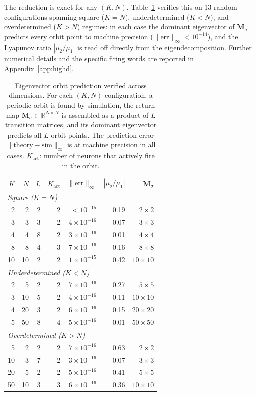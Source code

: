\documentclass[12pt]{article}
\newcommand{\vv}[1]{\mathbf{#1}}
\newcommand{\RR}{\mathbb{R}}
\begin{document}
The reduction is exact for any $(K,N)$. Table~\ref{tab:highd} verifies this on 13 random configurations spanning square ($K=N$), underdetermined ($K<N$), and overdetermined ($K>N$) regimes: in each case the dominant eigenvector of $\vv{M}_\sigma$ predicts every orbit point to machine precision ($\|\text{err}\|_\infty<10^{-14}$), and the Lyapunov ratio $|\mu_2/\mu_1|$ is read off directly from the eigendecomposition. Further numerical details and the specific firing words are reported in Appendix~\ref{app:highd}.

\begin{table}[t]
\centering
\caption{Eigenvector orbit prediction verified across dimensions.  
For each $(K,N)$ configuration, a periodic orbit is found by simulation, 
the return map $\vv{M}_\sigma\in\RR^{N\times N}$ is assembled as a 
product of $L$ transition matrices, and its dominant eigenvector predicts 
all $L$ orbit points.  The prediction error 
$\|\text{theory}-\text{sim}\|_\infty$ is at machine precision in all 
cases.  $K_{\text{act}}$: number of neurons that actively fire in the 
orbit.}\label{tab:highd}
\begin{tabular}{rr rrr rr}
\toprule
$K$ & $N$ & $L$ & $K_{\text{act}}$ & $\|\text{err}\|_\infty$ 
& $|\mu_2/\mu_1|$ & $\vv{M}_\sigma$ \\
\midrule
\multicolumn{7}{l}{\emph{Square ($K{=}N$)}} \\
 2 &  2 &   2 &  2 & $< 10^{-15}$ & 0.19 & $2{\times}2$ \\
 3 &  3 &   3 &  2 & $4{\times}10^{-16}$ & 0.07 & $3{\times}3$ \\
 4 &  4 &   8 &  2 & $3{\times}10^{-16}$ & 0.01 & $4{\times}4$ \\
 8 &  8 &   4 &  3 & $7{\times}10^{-16}$ & 0.16 & $8{\times}8$ \\
10 & 10 &   2 &  2 & $1{\times}10^{-15}$ & 0.42 & $10{\times}10$ \\
\midrule
\multicolumn{7}{l}{\emph{Underdetermined ($K{<}N$)}} \\
 2 &  5 &   2 &  2 & $7{\times}10^{-16}$ & 0.27 & $5{\times}5$ \\
 3 & 10 &   5 &  2 & $4{\times}10^{-16}$ & 0.11 & $10{\times}10$ \\
 4 & 20 &   3 &  2 & $6{\times}10^{-16}$ & 0.15 & $20{\times}20$ \\
 5 & 50 &   8 &  4 & $5{\times}10^{-16}$ & 0.01 & $50{\times}50$ \\
\midrule
\multicolumn{7}{l}{\emph{Overdetermined ($K{>}N$)}} \\
 5 &  2 &   2 &  2 & $7{\times}10^{-16}$ & 0.63 & $2{\times}2$ \\
10 &  3 &   7 &  2 & $3{\times}10^{-16}$ & 0.07 & $3{\times}3$ \\
20 &  5 &   2 &  2 & $5{\times}10^{-16}$ & 0.41 & $5{\times}5$ \\
50 & 10 &   3 &  3 & $6{\times}10^{-16}$ & 0.36 & $10{\times}10$ \\
\bottomrule
\end{tabular}
\end{table}
\end{document}
